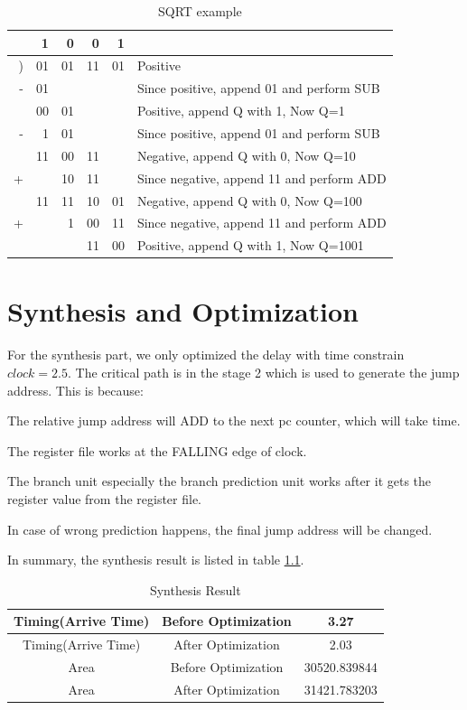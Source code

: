 \begin{table}[!ht]
\centering
\caption{SQRT example}
\label{tab:sqrt}
\begin{tabular}{rrrrr l}
  &  1 &  0 &  0 &  1 & \\
\hline
) & 01 & 01 & 11 & 01 & Positive\\
- & 01 &    &    &    & Since positive, append 01 and perform SUB\\
\hline
  & 00 & 01 &    &    & Positive, append Q with 1, Now Q=1\\
- &  1 & 01 &    &    & Since positive, append 01 and perform SUB\\
\hline
  & 11 & 00 & 11 &    & Negative, append Q with 0, Now Q=10\\
+ &    & 10 & 11 &    & Since negative, append 11 and perform ADD\\
\hline
  & 11 & 11 & 10 & 01 & Negative, append Q with 0, Now Q=100\\
+ &    &  1 & 00 & 11 & Since negative, append 11 and perform ADD\\
\hline
  &    &    & 11 & 00 & Positive, append Q with 1, Now Q=1001\\
\end{tabular}
\end{table}


\chapter[Synthesis and Optimization]{Synthesis and Optimization}
For the synthesis part, we only optimized the delay with time constrain $clock=2.5$.
The critical path is in the stage 2 which is used to generate the jump address. This
is because:

\begin{description}
  \item The relative jump address will ADD to the next pc counter, which will take time.
  \item The register file works at the FALLING edge of clock.
  \item The branch unit especially the branch prediction unit works after it gets the register value from the register file.
  \item In case of wrong prediction happens, the final jump address will be changed.
\end{description}

In summary, the synthesis result is listed in table \ref{tab:syn}.
\begin{table}[!ht]
\centering
\caption{Synthesis Result}
\label{tab:syn}
\begin{tabular}{|c|c|c|}
\hline
Timing(Arrive Time) & Before Optimization & 3.27 \\
\hline
Timing(Arrive Time) & After Optimization & 2.03 \\
\hline
Area & Before Optimization & 30520.839844 \\
\hline
Area & After Optimization & 31421.783203 \\
\hline
\end{tabular}
\end{table}


